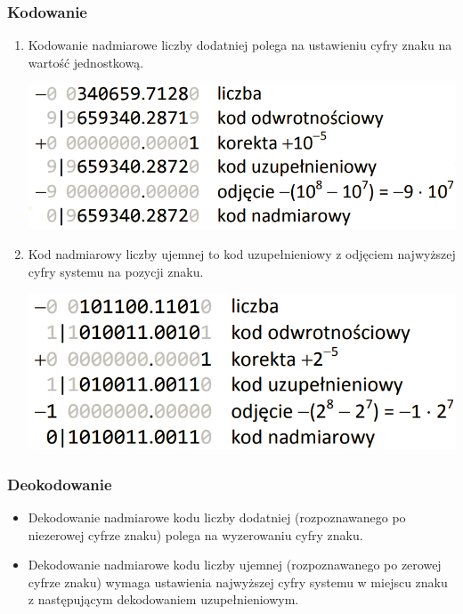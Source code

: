 \documentclass[12pt]{article}
\begin{document}
    \subsubsection{Kodowanie}
    \begin{enumerate}
        \item Kodowanie nadmiarowe liczby dodatniej polega na
        ustawieniu cyfry znaku na wartość jednostkową.
        \begin{center}
                \includegraphics[scale=0.4]{graphics/number-repr/nad-encode-dec.png}
        \end{center}
        \item Kod nadmiarowy liczby ujemnej to kod uzupełnieniowy z odjęciem najwyższej cyfry systemu
            na pozycji znaku.
        \begin{center}
                \includegraphics[scale=0.4]{graphics/number-repr/nad-encode-bin.png}
        \end{center}
    \end{enumerate}
        
        
    \subsubsection{Deokodowanie}
    \begin{itemize}
        \item Dekodowanie nadmiarowe kodu liczby dodatniej
        (rozpoznawanego po niezerowej cyfrze znaku) polega na wyzerowaniu cyfry znaku.
        \item Dekodowanie nadmiarowe kodu liczby ujemnej
            (rozpoznawanego po zerowej cyfrze znaku) wymaga
            ustawienia najwyższej cyfry systemu w miejscu znaku z następującym dekodowaniem uzupełnieniowym.
    \end{itemize}
    
\end{document}
